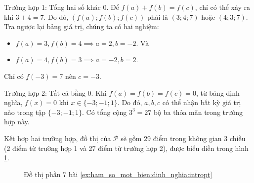\textcolor{colorEmphasis}{Trường hợp 1}: Tổng hai số khác 0. Để $f(a) + f(b) = f(c)$, chỉ có thể xảy ra khi $3 + 4 = 7$. Do đó, $(f(a); f(b); f(c))$ phải là $(3; 4; 7)$ hoặc $(4; 3; 7)$. Tra ngược lại bảng giá trị, chúng ta có hai nghiệm:
   \begin{itemize}
      \item $f(a)=3, f(b)=4 \implies a=2, b=-2$. Và
      \item $f(a)=4, f(b)=3 \implies a=-2, b=2$.
   \end{itemize}

Chỉ có $f(-3) = 7$ nên $c = -3$.

\textcolor{colorEmphasisCyan}{Trường hợp 2}: Tất cả bằng 0. Khi $f(a) = f(b) = f(c) = 0$, từ bảng định nghĩa, $f(x)=0$ khi $x \in \{-3; -1; 1\}$. Do đó, $a, b, c$ có thể nhận bất kỳ giá trị nào trong tập $\{-3; -1; 1\}$. Có tổng cộng $3^3 = 27$ bộ ba thỏa mãn trong trường hợp này.

Kết hợp hai trường hợp, đồ thị của $\mathcal{P}$ sẽ gồm 29 điểm trong không gian 3 chiều (2 điểm từ trường hợp 1 và 27 điểm từ trường hợp 2), được biểu diễn trong hình \ref{fig:ham_so_mot_bien:dinh_nghia:dtp8}.

\begin{figure}[H]
   \centering
   \caption{Đồ thị phần 7 bài \ref{ex:ham_so_mot_bien:dinh_nghia:intropt}}
   \label{fig:ham_so_mot_bien:dinh_nghia:dtp8}
\end{figure}

